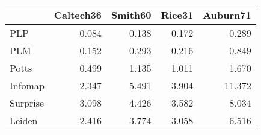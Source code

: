 \begin{tabular}{lrrrr}
\toprule
{} & Caltech36 & Smith60 & Rice31 & Auburn71 \\
\midrule
PLP      &     0.084 &   0.138 &  0.172 &    0.289 \\
PLM      &     0.152 &   0.293 &  0.216 &    0.849 \\
Potts    &     0.499 &   1.135 &  1.011 &    1.670 \\
Infomap  &     2.347 &   5.491 &  3.904 &   11.372 \\
Surprise &     3.098 &   4.426 &  3.582 &    8.034 \\
Leiden   &     2.416 &   3.774 &  3.058 &    6.516 \\
\bottomrule
\end{tabular}
